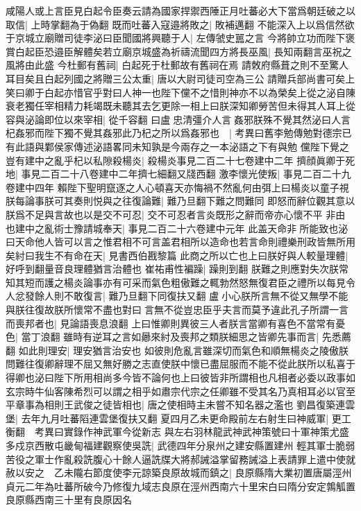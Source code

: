 咸陽人或上言臣見白起令臣奏云請為國家捍禦西陲正月吐蕃必大下當爲朝廷破之以取信|{
	上時掌翻為于偽翻}
既而吐蕃入寇邉將敗之|{
	敗補邁翻}
不能深入上以爲信然欲于京城立廟贈司徒李泌曰臣聞國將興聽于人|{
	左傳虢史嚚之言}
今將帥立功而陛下褒賞白起臣恐邉臣解體矣若立廟京城盛為祈禱流聞四方將長巫風|{
	長知兩翻言巫祝之風將由此盛}
今杜郵有舊祠|{
	白起死于杜郵故有舊祠在焉}
請敇府縣葺之則不至驚人耳目矣且白起列國之將贈三公太重|{
	唐以大尉司徒司空為三公}
請贈兵部尚書可矣上笑曰卿于白起亦惜官乎對曰人神一也陛下儻不之惜則神亦不以為榮矣上從之泌自陳衰老獨任宰相精力耗竭既未聽其去乞更除一相上曰朕深知卿勞苦但未得其人耳上從容與泌論即位以來宰相|{
	從千容翻}
曰盧忠清彊介人言姦邪朕殊不覺其然泌曰人言杞姦邪而陛下獨不覺其姦邪此乃杞之所以爲姦邪也　|{
	考異曰舊李勉傳勉對德宗已有此語與鄴侯家傳述泌語畧同未知孰是今兩存之一本泌語之下有與勉}
儻陛下覺之豈有建中之亂乎杞以私隙殺楊炎|{
	殺楊炎事見二百二十七卷建中二年}
擠顔眞卿于死地|{
	事見二百二十八卷建中二年擠七細翻又牋西翻}
激李懷光使叛|{
	事見二百二十九卷建中四年}
賴陛下聖明竄逐之人心頓喜天亦悔禍不然亂何由弭上曰楊炎以童子視朕每論事朕可其奏則悦與之往復論難|{
	難乃旦翻下難之問難同}
即怒而辭位觀其意以朕爲不足與言故也以是交不可忍|{
	交不可忍者言炎既形之辭而帝亦心懷不平}
非由也建中之亂術士豫請城奉天|{
	事見二百二十六卷建中元年}
此盖天命非所能致也泌曰天命他人皆可以言之惟君相不可言盖君相所以造命也若言命則禮樂刑政皆無所用矣紂曰我生不有命在天|{
	見書西伯戡黎篇}
此商之所以亡也上曰朕好與人較量理體|{
	好呼到翻量音良理體猶言治體也}
崔祐甫性褊躁|{
	躁則到翻}
朕難之則應對失次朕常知其短而護之楊炎論事亦有可采而氣色粗傲難之輒勃然怒無復君臣之禮所以每見令人忿發餘人則不敢復言|{
	難乃旦翻下同復扶又翻}
盧小心朕所言無不從又無學不能與朕往復故朕所懷常不盡也對曰言無不從豈忠臣乎夫言而莫予違此孔子所謂一言而喪邦者也|{
	見論語喪息浪翻}
上曰惟卿則異彼三人者朕言當卿有喜色不當常有憂色|{
	當丁浪翻}
雖時有逆耳之言如曏來紂及喪邦之類朕細思之皆卿先事而言|{
	先悉薦翻}
如此則理安|{
	理安猶言治安也}
如彼則危亂言雖深切而氣色和順無楊炎之陵傲朕問難往復卿辭理不屈又無好勝之志直使朕中懷已盡屈服而不能不從此朕所以私喜于得卿也泌曰陛下所用相尚多今皆不論何也上曰彼皆非所謂相也凡相者必委以政事如玄宗時牛仙客陳希烈可以謂之相乎如肅宗代宗之任卿雖不受其名乃真相耳必以官至平章事為相則王武俊之徒皆相也|{
	唐之使相時主未嘗不知名器之濫也}
劉昌復築連雲堡|{
	去年九月吐蕃䧟連雲堡復扶又翻}
夏四月乙未更命殿前左右射生曰神威軍|{
	更工衡翻　考異曰實錄作神武軍今從新志}
與左右羽林龍武神武神策號曰十軍神策尤盛多戍京西散屯畿甸福建觀察使吳詵|{
	武德四年分泉州之建安縣置建州}
輕其軍士脆弱苦役之軍士作亂殺詵腹心十餘人逼詵牒大將郝誡溢掌留務誡溢上表請罪上遣中使就赦以安之　乙未隴右節度使李元諒築良原故城而鎮之|{
	良原縣隋大業初置唐屬涇州貞元二年為吐蕃所破今乃修復九域志良原在涇州西南六十里宋白曰隋分安定鶉觚置良原縣西南三十里有良原因名}
